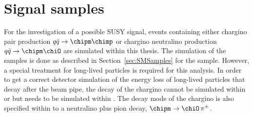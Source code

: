 \section{Signal samples}
\label{sec:SignalSamples}
For the investigation of a possible SUSY signal, events containing either chargino pair production $q\bar{q} \rightarrow \chipm \chimp$ or chargino neutralino production $q\bar{q} \rightarrow \chipm \chiO$ are simulated within this thesis. 
The simulation of the samples is done as described in Section~\ref{sec:SMSamples} for the \WJets sample.
However, a special treatment for long-lived particles is required for this analysis.
In order to get a correct detector simulation of the energy loss of long-lived particles that decay after the beam pipe, the decay of the chargino cannot be simulated within \madgraph or \pythia but needs to be simulated within \geant.
The decay mode of the chargino is also specified within \geant to a neutralino plus pion decay, $ \chipm \rightarrow \chiO\, \pi^{\pm}$.

